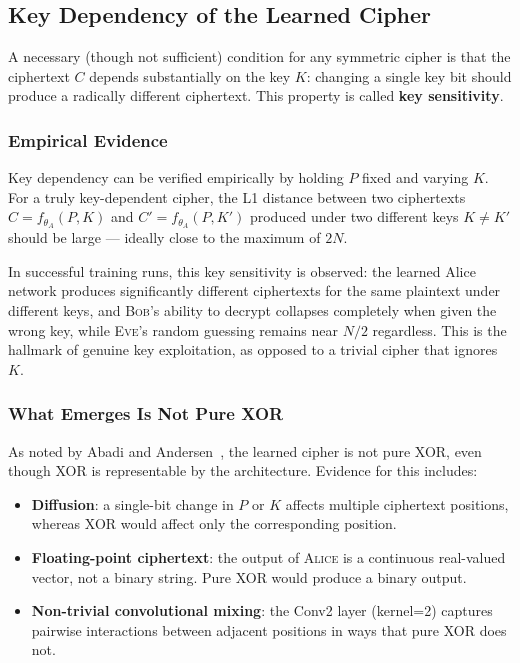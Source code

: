\documentclass[12pt, a4paper]{article}
\newcommand{\alice}{\textsc{Alice}}
\newcommand{\bob}{\textsc{Bob}}
\newcommand{\eve}{\textsc{Eve}}
\newcommand{\thetaA}{\theta_{\!A}}
\begin{document}
\subsection{Key Dependency of the Learned Cipher}
\label{subsec:key_dependency}

A necessary (though not sufficient) condition for any symmetric cipher
is that the ciphertext $C$ depends substantially on the key $K$: changing
a single key bit should produce a radically different ciphertext. This
property is called \textbf{key sensitivity}.

\subsubsection*{Empirical Evidence}

Key dependency can be verified empirically by holding $P$ fixed and
varying $K$. For a truly key-dependent cipher, the L1 distance between
two ciphertexts $C = f_{\thetaA}(P, K)$ and $C' = f_{\thetaA}(P, K')$
produced under two different keys $K \neq K'$ should be large --- ideally
close to the maximum of $2N$.

In successful training runs, this key sensitivity is observed: the
learned Alice network produces significantly different ciphertexts for
the same plaintext under different keys, and \bob{}'s ability to decrypt
collapses completely when given the wrong key, while \eve{}'s random
guessing remains near $N/2$ regardless. This is the hallmark of
genuine key exploitation, as opposed to a trivial cipher that ignores $K$.

\subsubsection*{What Emerges Is Not Pure XOR}

As noted by Abadi and Andersen~\cite{abadi2016learning}, the learned
cipher is not pure XOR, even though XOR is representable by the
architecture. Evidence for this includes:

\begin{itemize}[leftmargin=1.8em, itemsep=4pt]
  \item \textbf{Diffusion}: a single-bit change in $P$ or $K$ affects
        multiple ciphertext positions, whereas XOR would affect only
        the corresponding position.
  \item \textbf{Floating-point ciphertext}: the output of
        \alice{} is a continuous real-valued vector, not a binary
        string. Pure XOR would produce a binary output.
  \item \textbf{Non-trivial convolutional mixing}: the Conv2
        layer (kernel=2) captures pairwise interactions between adjacent
        positions in ways that pure XOR does not.
\end{itemize}
\end{document}
